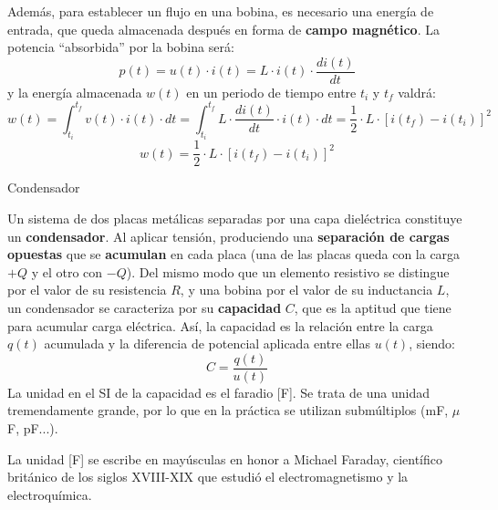 \documentclass[11pt]{book} %
\makeatletter
\numberwithin{dummy}{section}
\theoremstyle{ocrenumbox}
\theoremstyle{blacknumex}
\theoremstyle{blacknumbox}
\theoremstyle{ocrenum}
\newenvironment{remark}{\par\vspace{10pt}\small %
\begin{list}{}{
\leftmargin=35pt %
\rightmargin=25pt}\item\ignorespaces %
\makebox[-2.5pt]{\begin{tikzpicture}[overlay]
\node[draw=ocre!60,line width=1pt,circle,fill=ocre!25,font=\sffamily\bfseries,inner sep=2pt,outer sep=0pt] at (-15pt,0pt){\textcolor{ocre}{N}};\end{tikzpicture}} %
\advance\baselineskip -1pt}{\end{list}\vskip5pt} %
\renewcommand{\subsubsection}{\@startsection {subsubsection}{3}{\z@}
{-2ex \@plus -0.1ex \@minus -.2ex}
{.2ex \@plus.2ex }
{\normalfont\small\sffamily\bfseries}}
\newlength\esp
\makeatother
\begin{document}
	Además, para establecer un flujo en una bobina, es necesario una energía de entrada, que queda almacenada después en forma de \textbf{campo magnético}. La potencia ``absorbida'' por la bobina será:
	\begin{equation*}
		p(t)=u(t)\cdot i(t)=L\cdot i(t)\cdot\dfrac{di(t)}{dt}
	\end{equation*}
	y la energía almacenada $w(t)$ en un periodo de tiempo entre $t_i$ y $t_f$ valdrá:
	\begin{equation*}
		w(t)=\int_{t_i}^{t_f}v(t)\cdot i(t)\cdot dt=\int_{t_i}^{t_f}L\cdot\dfrac{di(t)}{dt}\cdot i(t)\cdot dt=\dfrac{1}{2}\cdot L\cdot [i(t_f)-i(t_i)]^2
	\end{equation*}
	\begin{equation}
		\boxed{w(t)=\dfrac{1}{2}\cdot L\cdot [i(t_f)-i(t_i)]^2}
	\end{equation}
	
	\subsubsection{Condensador}\label{sec.condensador}
	
	Un sistema de dos placas metálicas separadas por una capa dieléctrica constituye un \textbf{condensador}. Al aplicar tensión, produciendo una \textbf{separación de cargas opuestas} que se \textbf{acumulan} en cada placa (una de las placas queda con la carga $+Q$ y el otro con $-Q$). Del mismo modo que un elemento resistivo se distingue por el valor de su resistencia $R$, y una bobina por el valor de su inductancia $L$, un condensador se caracteriza por su \textbf{capacidad} $C$, que es la aptitud que tiene para acumular carga eléctrica. Así, la capacidad es la relación entre la carga $q(t)$ acumulada y la diferencia de potencial aplicada entre ellas $u(t)$, siendo:
	\begin{equation}\label{eq.cqu}
		\boxed{C=\dfrac{q(t)}{u(t)}}
	\end{equation}
	La unidad en el SI de la capacidad es el faradio [F]. Se trata de una unidad tremendamente grande, por lo que en la práctica se utilizan submúltiplos (mF, $\mu$F, pF...). 
	\begin{remark}
		La unidad [F] se escribe en mayúsculas en honor a Michael Faraday, científico británico de los siglos XVIII-XIX que estudió el electromagnetismo y la electroquímica. 
	\end{remark}
	
\end{document}
